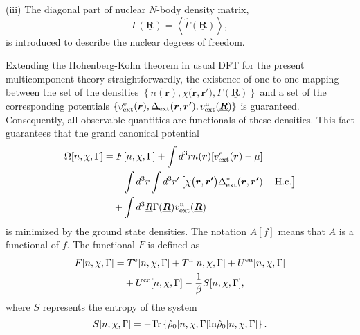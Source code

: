 (iii) The diagonal part of nuclear $N$-body density matrix,
%
\begin{equation} %
	\Gamma(\underline{\bm{R}}) = \left<\hat{\Gamma}(\underline{\bm{R}}) \right>,
\end{equation}
%
is introduced to describe the nuclear degrees of freedom.

Extending the Hohenberg-Kohn theorem in usual DFT\cite{HK1964,Mermin1965} for the present 
multicomponent theory straightforwardly, 
the existence of one-to-one mapping between the set of the densities $ \left\{ n(\bm{r}), \chi \bigl(\bm{r}, \bm{r'} \bigr), 
\Gamma(\underline{\bm{R}}) \right\}$ and a set of the corresponding potentials 
$ \left\{ v^{\rm e}_{\rm ext}(\bm{r}), \Delta_\mathrm{ext}(\bm{r}, \bm{r'}), v^{\rm n}_{\rm ext}(\underline{\bm{R}}) \right\}$
is guaranteed\cite{HK1964, Mermin1965}.
Consequently, all observable quantities are functionals of these densities. 
This fact guarantees that the grand canonical potential 
%
\begin{equation}  %
\begin{split}
	\label{eq:grand_pot}
	\Omega[n, \chi, \Gamma] &= F[n, \chi, \Gamma] + \int d^3r n(\bm{r})[v^{\rm e}_{\rm ext}(\bm{r}) - \mu] \\
	                                    &\quad- \int d^3r \int d^3r' \left[\chi \bigl(\bm{r}, \bm{r'} \bigr)
	                                       \Delta^{\ast}_\mathrm{ext}(\bm{r}, \bm{r'}) + {\rm H.c.} \right]\\
	                     &\quad+ \int d^3\underline{R} \Gamma(\underline{\bm{R}})v^{\rm n}_{\rm ext}(\underline{\bm{R}})
\end{split}
\end{equation}
%
is minimized by the ground state densities. The notation $A[f]$ means that $A$ is a functional of $f$.
The functional $F$ is defined as
%
\begin{equation} %
\label{eq:Free_int}
\begin{split}
	F[n, \chi, \Gamma] &= T^{\rm e}[n, \chi, \Gamma] + T^{\rm n}[n, \chi, \Gamma] + U^{\rm en}[n, \chi, \Gamma] \\
	                                  &\quad + U^{\rm ee}[n, \chi, \Gamma] - \frac{1}{\beta}S[n, \chi, \Gamma],
\end{split}
\end{equation}
%
where $S$ represents the entropy of the system
%
\begin{equation}
	S[n, \chi, \Gamma] = -{\rm Tr}\left\{\hat{\rho}_0 [n, \chi, \Gamma]{\rm ln}\hat{\rho}_0 [n, \chi, \Gamma] \right\}.
\end{equation}
%

